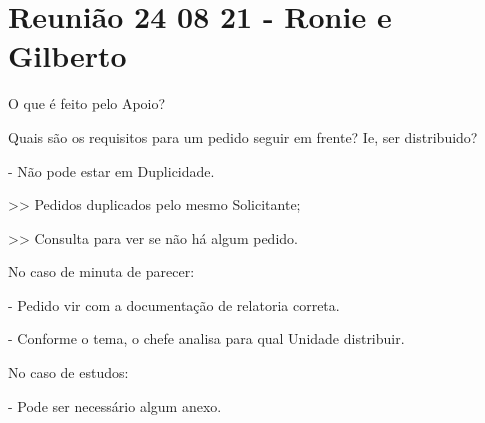 \section{Reunião 24 08 21 - Ronie e Gilberto}

O que é feito pelo Apoio?

Quais são os requisitos para um pedido seguir em frente? Ie, ser distribuido?

- Não pode estar em Duplicidade.

>> Pedidos duplicados pelo mesmo Solicitante;


>> Consulta para ver se não há algum pedido. 





No caso de minuta de parecer:

- Pedido vir com a documentação de relatoria correta.

- Conforme o tema, o chefe analisa para qual Unidade distribuir.

No caso de estudos:

- Pode ser necessário algum anexo.
